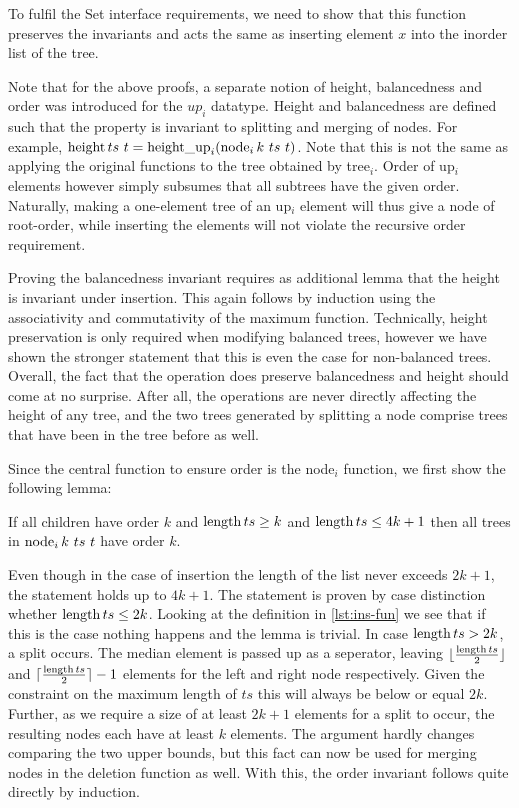 To fulfil the Set interface requirements,
we need to show that this function preserves the invariants
and acts the same as inserting element $x$ into the inorder list of the tree.

Note that for the above proofs, a separate notion of height, balancedness and order
was introduced for the $up_i$ datatype.
Height and balancedness are
defined such that the property is invariant to splitting and merging of nodes.
For example, $\height ts\ t = \heightup_i (\node_i k\ ts\ t)$.
Note that this is not the same as applying the original functions
to the tree obtained by tree$_i$.
Order of up$_i$ elements however simply subsumes that all subtrees have
the given order.
Naturally, making a one-element tree of an up$_i$ element will thus
give a node of root-order, while inserting the elements
will not violate the recursive order requirement.

Proving the balancedness invariant requires as additional lemma that
the height is invariant under insertion.
This again follows by induction using the
associativity and commutativity of the maximum function.
Technically, height preservation is only required when modifying balanced
trees, however we have shown the stronger statement that this is even the case for non-balanced trees.
Overall, the fact that the operation does preserve balancedness and height should come at no surprise.
After all, the operations are never directly affecting the height of any tree,
and the two trees generated by splitting a node comprise trees that have been in the tree before as well.

Since the central function to ensure order is the node$_i$ function,
we first show the following lemma:

\begin{lemma}
\label{lem:nodei-order}
    If all children have order $k$ and $\operatorname{length} ts \ge k$ and $\operatorname{length} ts \le 4k+1$
    then all trees in $\operatorname{node}_i k\ ts\ t$ have order $k$.
\end{lemma}

Even though in the case of insertion the length of the list
never exceeds $2k+1$, the statement holds up to $4k+1$.
The statement is proven by case distinction whether $\operatorname{length} ts \le 2k$.
Looking at the definition in \autoref{lst:ins-fun}
we see that if this is the case nothing happens and the lemma is trivial.
In case $\operatorname{length} ts > 2k$, a split occurs.
The median element is passed up as a seperator, leaving
$\lfloor\frac{\operatorname{length} ts}{2}\rfloor$ and $\lceil\frac{\operatorname{length} ts}{2}\rceil - 1$
elements for the left and right node respectively.
Given the constraint on the maximum length of $ts$
this will always be below or equal $2k$.
Further, as we require a size of at least $2k+1$ elements for a split to occur,
the resulting nodes each have at least $k$ elements.
The argument hardly changes comparing the two upper bounds,
but this fact can now be used for merging nodes in the deletion function as well.
With this, the order invariant follows quite directly by induction.

